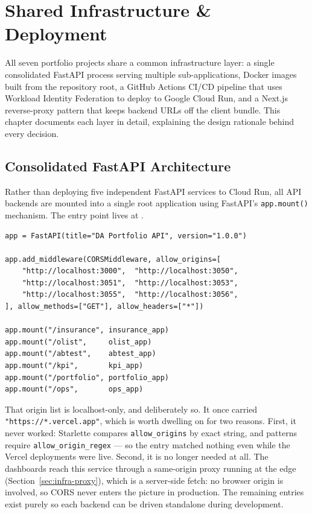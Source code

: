 \chapter{Shared Infrastructure \& Deployment}
\label{ch:infrastructure}

All seven portfolio projects share a common infrastructure layer: a single consolidated FastAPI process serving multiple sub-applications, Docker images built from the repository root, a GitHub Actions CI/CD pipeline that uses Workload Identity Federation to deploy to Google Cloud Run, and a Next.js reverse-proxy pattern that keeps backend URLs off the client bundle. This chapter documents each layer in detail, explaining the design rationale behind every decision.

\section{Consolidated FastAPI Architecture}
\label{sec:infra-fastapi}


Rather than deploying five independent FastAPI services to Cloud Run, all API backends are mounted into a single root application using FastAPI's \texttt{app.mount()} mechanism. The entry point lives at .

\begin{lstlisting}[style=python, caption={Consolidated API entry point -- backend/main.py}]
app = FastAPI(title="DA Portfolio API", version="1.0.0")

app.add_middleware(CORSMiddleware, allow_origins=[
    "http://localhost:3000",  "http://localhost:3050",
    "http://localhost:3051",  "http://localhost:3053",
    "http://localhost:3055",  "http://localhost:3056",
], allow_methods=["GET"], allow_headers=["*"])

app.mount("/insurance", insurance_app)
app.mount("/olist",     olist_app)
app.mount("/abtest",    abtest_app)
app.mount("/kpi",       kpi_app)
app.mount("/portfolio", portfolio_app)
app.mount("/ops",       ops_app)
\end{lstlisting}

\begin{keyinsight}
That origin list is localhost-only, and deliberately so. It once carried
\texttt{"https://*.vercel.app"}, which is worth dwelling on for two reasons.
First, it never worked: Starlette compares \texttt{allow\_origins} by exact
string, and patterns require \texttt{allow\_origin\_regex} --- so the entry
matched nothing even while the Vercel deployments were live. Second, it is no
longer needed at all. The dashboards reach this service through a same-origin
proxy running at the edge (Section~\ref{sec:infra-proxy}), which is a
server-side fetch: no browser origin is involved, so CORS never enters the
picture in production. The remaining entries exist purely so each backend can be
driven standalone during development.
\end{keyinsight}

